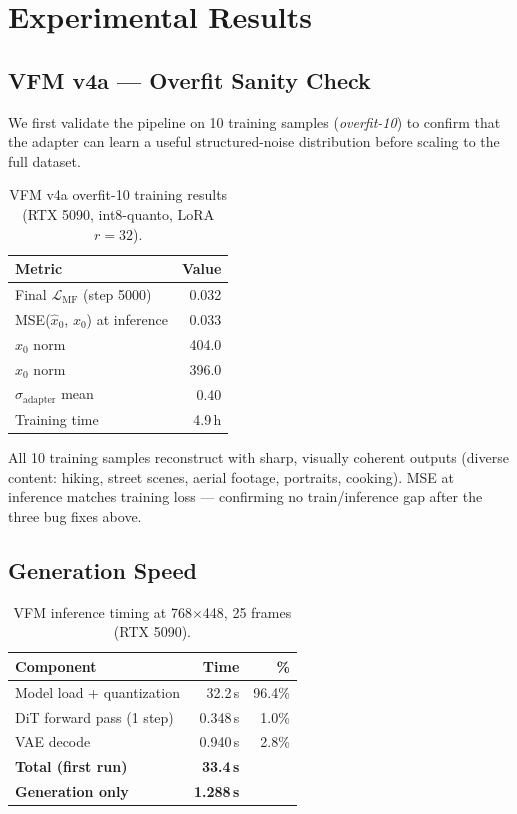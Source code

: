 \documentclass[10pt,twocolumn]{article}
\begin{document}
\section{Experimental Results}
\label{sec:results}

\subsection{VFM v4a — Overfit Sanity Check}

We first validate the pipeline on 10 training samples (\emph{overfit-10}) to confirm that the adapter can learn a useful structured-noise distribution before scaling to the full dataset.

\begin{table}[h]
\centering
\caption{VFM v4a overfit-10 training results (RTX 5090, int8-quanto, LoRA $r=32$).}
\label{tab:overfit}
\begin{tabular}{@{}lr@{}}
\toprule
Metric & Value \\
\midrule
Final $\mathcal{L}_{\text{MF}}$ (step 5000) & 0.032 \\
MSE($\hat{x}_0$, $x_0$) at inference & 0.033 \\
$x_0$ norm & 404.0 \\
$\hat{x}_0$ norm & 396.0 \\
$\sigma_{\text{adapter}}$ mean & 0.40 \\
Training time & 4.9\,h \\
\bottomrule
\end{tabular}
\end{table}

All 10 training samples reconstruct with sharp, visually coherent outputs (diverse content: hiking, street scenes, aerial footage, portraits, cooking). MSE at inference matches training loss — confirming no train/inference gap after the three bug fixes above.

\subsection{Generation Speed}

\begin{table}[h]
\centering
\caption{VFM inference timing at 768$\times$448, 25 frames (RTX 5090).}
\label{tab:speed}
\begin{tabular}{@{}lrr@{}}
\toprule
Component & Time & \% \\
\midrule
Model load + quantization & 32.2\,s & 96.4\% \\
DiT forward pass (1 step) & 0.348\,s & 1.0\% \\
VAE decode & 0.940\,s & 2.8\% \\
\midrule
\textbf{Total (first run)} & \textbf{33.4\,s} & \\
\textbf{Generation only} & \textbf{1.288\,s} & \\
\bottomrule
\end{tabular}
\end{table}
\end{document}
